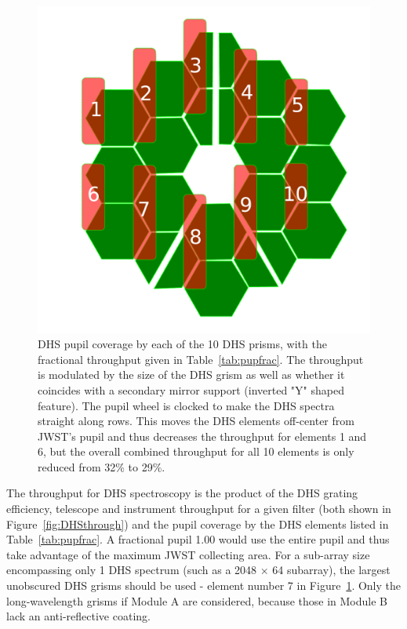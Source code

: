 \documentclass[iop]{emulateapj}
\begin{document}
\begin{figure}[!t]
\centering
\includegraphics[width=1.0\columnwidth]{dhs_pupil_labels_modA.pdf}
\caption{DHS pupil coverage by each of the 10 DHS prisms, with the fractional throughput given in Table~\ref{tab:pupfrac}. 
The throughput is modulated by the size of the DHS grism as well as whether it coincides with a secondary mirror support (inverted "Y" shaped feature).
The pupil wheel is clocked to make the DHS spectra straight along rows.
This moves the DHS elements off-center from JWST's pupil and thus decreases the throughput for elements 1 and 6, but the overall combined throughput for all 10 elements is only reduced from 32\% to 29\%.}\label{fig:DHSvsPupilOverlay}
\end{figure}

The throughput for DHS spectroscopy is the product of the DHS grating efficiency, telescope and instrument throughput for a given filter (both shown in Figure~\ref{fig:DHSthrough}) and the pupil coverage by the DHS elements listed in Table~\ref{tab:pupfrac}.
A fractional pupil 1.00 would use the entire pupil and thus take advantage of the maximum JWST collecting area.
For a sub-array size encompassing only 1 DHS spectrum (such as a 2048 $\times$ 64 subarray), the largest unobscured DHS grisms should be used - element number 7 in Figure~\ref{fig:DHSvsPupilOverlay}.
Only the long-wavelength grisms if Module A are considered, because those in Module B lack an anti-reflective coating.
\end{document}
